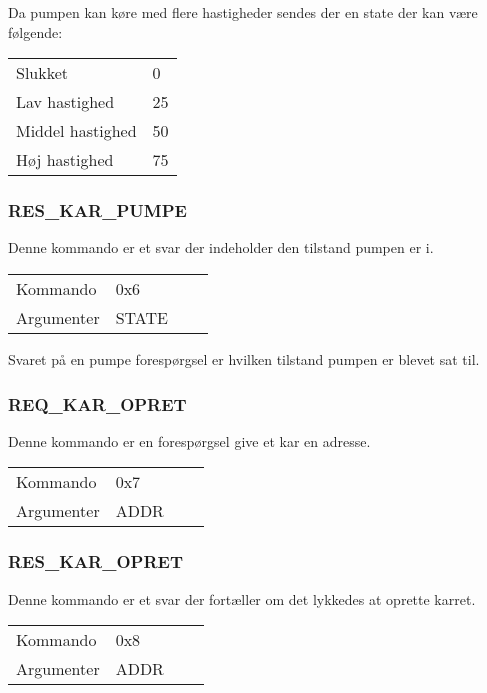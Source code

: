 Da pumpen kan køre med flere hastigheder sendes der en state der kan være følgende:

\begin{table}[H]
\setlength{\parindent}{12pt}
\begin{tabular}{|l|l|}
Slukket & 0 \\
Lav hastighed & 25 \\
Middel hastighed & 50 \\
Høj hastighed & 75 \\
\end{tabular}
\end{table}


\subsubsection{RES\_KAR\_PUMPE}
Denne kommando er et svar der indeholder den tilstand pumpen er i.

\begin{table}[H]
\setlength{\parindent}{12pt}
\begin{tabular}{|l|lcc|}
Kommando & 0x6 & & \\
Argumenter & STATE & & \\
\end{tabular}
\end{table}


Svaret på en pumpe forespørgsel er hvilken tilstand pumpen er blevet sat til.


\subsubsection{REQ\_KAR\_OPRET}
Denne kommando er en forespørgsel give et kar en adresse.

\begin{table}[H]
\setlength{\parindent}{12pt}
\begin{tabular}{|l|lcc|}
Kommando & 0x7 & & \\
Argumenter & ADDR & & \\
\end{tabular}
\end{table}


\subsubsection{RES\_KAR\_OPRET}
Denne kommando er et svar der fortæller om det lykkedes at oprette karret.

\begin{table}[H]
\setlength{\parindent}{12pt}
\begin{tabular}{|l|lcc|}
Kommando & 0x8 & & \\
Argumenter & ADDR & & \\
\end{tabular}
\end{table}


